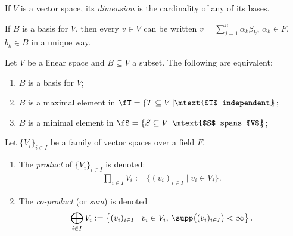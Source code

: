     \begin{definition}
        If $V$ is a vector space, its \textit{dimension} is the cardinality of any of its bases.
    \end{definition}

    \begin{corollary}
        If $B$ is a basis for $V$, then every $v \in V$ can be written $v = \sum_{j = 1}^n \alpha_k \beta_k$, $\alpha_k \in F$, $b_k \in B$ in a unique way.
    \end{corollary}

    \begin{theorem}
        Let $V$ be a linear space and $B \subseteq V$ a subset. The following are equivalent:
            \begin{enumerate}[label = (\arabic*),itemsep=1pt,topsep=3pt]
                \item $B$ is a basis for $V$;
                \item $B$ is a maximal element in $\fT = \{T \subseteq V \mid \hspace{-4pt}\mtext{$T$ independent}\hspace{-4pt}\}$;
                \item $B$ is a minimal element in $\fS = \{S \subseteq V \mid \hspace{-4pt}\mtext{$S$ spans $V$}\hspace{-4pt}\}$;
            \end{enumerate}
    \end{theorem}

    \begin{definition}
        Let $\{V_i\}_{i \in I}$ be a family of vector spaces over a field $F$.
            \begin{enumerate}[label = (\arabic*),itemsep=1pt,topsep=3pt]
                \item The \textit{product} of $\{V_i\}_{i \in I}$ is denoted:
                    \begin{equation*}
                    \begin{split}
                        \prod_{i \in I}V_i := \{(v_i)_{i \in I} \mid v_i \in V_i\}.
                    \end{split}
                    \end{equation*}
                \item The \textit{co-product} (or \textit{sum}) is denoted 
                    \begin{equation*}
                    \begin{split}
                        \bigoplus_{i \in I}V_i := \left\{(v_i)_{i \in I} \mid v_i \in V_i,\hspace{2pt} \supp\bigl((v_i)_{i \in I}\bigr) <\infty \right\}.
                    \end{split}
                    \end{equation*}
            \end{enumerate}
    \end{definition}

